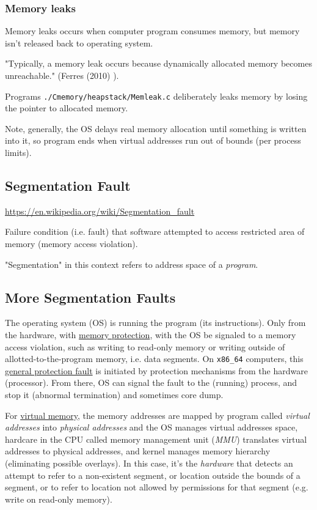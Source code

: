 \documentclass[10pt]{amsart}
\begin{document}
\begin{multicols*}{2}
\subsubsection{Memory leaks}  

Memory leaks occurs when computer program consumes memory, but memory isn't released back to operating system.  

"Typically, a memory leak occurs because dynamically allocated memory becomes unreachable."  (Ferres (2010) \cite{Ferr2010}).  

Programs \verb|./Cmemory/heapstack/Memleak.c| deliberately leaks memory by losing the pointer to allocated memory.  

Note, generally, the OS delays real memory allocation until something is written into it, so program ends when virtual addresses run out of bounds (per process limits).  

\subsection{Segmentation Fault}

\url{https://en.wikipedia.org/wiki/Segmentation_fault}

Failure condition (i.e. fault) that software attempted to access restricted area of memory (memory access violation).

"Segmentation" in this context refers to address space of a \emph{program}.



\subsection{More Segmentation Faults}  

The operating system (OS) is running the program (its instructions).  Only from the hardware, with \href{https://en.wikipedia.org/wiki/Memory_protection}{memory protection}, with the OS be signaled to a memory access violation, such as writing to read-only memory or writing outside of allotted-to-the-program memory, i.e. data segments.  On \verb|x86_64| computers, this \href{https://en.wikipedia.org/wiki/General_protection_fault}{general protection fault} is initiated by protection mechanisms from the hardware (processor).  From there, OS can signal the fault to the (running) process, and stop it (abnormal termination) and sometimes core dump. 

For \href{https://en.wikipedia.org/wiki/Virtual_memory}{virtual memory}, the memory addresses are mapped by program called \emph{virtual addresses} into \emph{physical addresses} and the OS manages virtual addresses space, hardcare in the CPU called memory management unit (\emph{MMU}) translates virtual addresses to physical addresses, and kernel manages memory hierarchy (eliminating possible overlays).  In this case, it's the \emph{hardware} that detects an attempt to refer to a non-existent segment, or location outside the bounds of a segment, or to refer to location not allowed by permissions for that segment (e.g. write on read-only memory).          


\end{multicols*}
\end{document}

